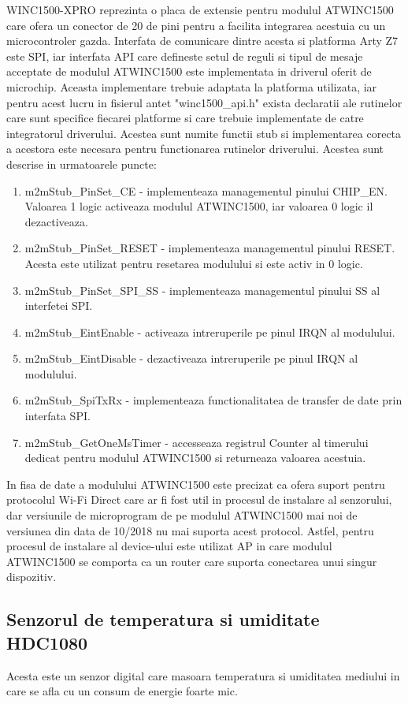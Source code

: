 WINC1500-XPRO reprezinta o placa de extensie pentru modulul ATWINC1500 care ofera un conector de 20 de pini pentru a facilita integrarea acestuia cu un microcontroler 
gazda. Interfata de comunicare dintre acesta si platforma Arty Z7 este SPI, iar interfata API care defineste setul de reguli si tipul de mesaje acceptate de modulul 
ATWINC1500 este implementata in driverul oferit de microchip. Aceasta implementare trebuie adaptata la platforma utilizata, iar pentru acest lucru in fisierul antet 
"winc1500\_api.h" exista declaratii ale rutinelor care sunt specifice fiecarei platforme si care trebuie implementate de catre 
integratorul driverului. Acestea sunt numite functii stub si implementarea corecta a acestora este necesara pentru functionarea rutinelor driverului. Acestea sunt 
descrise in urmatoarele puncte:
\begin{enumerate}
	\item m2mStub\_PinSet\_CE - implementeaza managementul pinului CHIP\_EN. Valoarea 1 logic activeaza modulul ATWINC1500, iar valoarea 0 logic il dezactiveaza.
	\item m2mStub\_PinSet\_RESET - implementeaza managementul pinului RESET. Acesta este utilizat pentru resetarea modulului si este activ in 0 logic.
	\item m2mStub\_PinSet\_SPI\_SS - implementeaza managementul pinului SS al interfetei SPI. 
	\item m2mStub\_EintEnable - activeaza intreruperile pe pinul IRQN al modulului.
	\item m2mStub\_EintDisable - dezactiveaza intreruperile pe pinul IRQN al modulului.
	\item m2mStub\_SpiTxRx - implementeaza functionalitatea de transfer de date prin interfata SPI.
	\item m2mStub\_GetOneMsTimer - accesseaza registrul Counter al timerului dedicat pentru modulul ATWINC1500 si returneaza valoarea acestuia.
\end{enumerate}

In fisa de date a modulului ATWINC1500 \cite{atwinc1500} este precizat ca ofera suport pentru protocolul Wi-Fi Direct care ar fi fost util in procesul de instalare al senzorului,
dar versiunile de microprogram de pe modulul ATWINC1500 mai noi de versiunea din data de 10/2018 nu mai suporta acest protocol. Astfel, pentru procesul de instalare al 
device-ului este utilizat AP in care modulul ATWINC1500 se comporta ca un router care suporta conectarea unui singur dispozitiv.

\subsection{Senzorul de temperatura si umiditate HDC1080}\label{subsec:hdc1080}
Acesta este un senzor digital care masoara temperatura si umiditatea mediului in care se afla cu un consum de energie foarte mic. 

